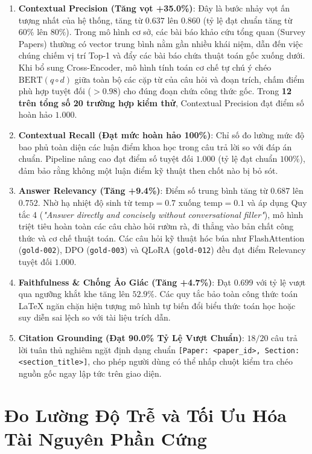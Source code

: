 \begin{enumerate}[label=\textbf{\arabic*.}]
  \item \textbf{Contextual Precision (Tăng vọt +35.0\%)}:
    Đây là bước nhảy vọt ấn tượng nhất của hệ thống, tăng từ $0.637$ lên \textbf{$0.860$} (tỷ lệ đạt chuẩn tăng từ $60\%$ lên \textbf{$80\%$}). Trong mô hình cơ sở, các bài báo khảo cứu tổng quan (Survey Papers) thường có vector trung bình nằm gần nhiều khái niệm, dẫn đến việc chúng chiếm vị trí Top-1 và đẩy các bài báo chứa thuật toán gốc xuống dưới. Khi bổ sung Cross-Encoder, mô hình tính toán cơ chế tự chú ý chéo $\text{BERT}(q \circ d)$ giữa toàn bộ các cặp từ của câu hỏi và đoạn trích, chấm điểm phù hợp tuyệt đối ($>0.98$) cho đúng đoạn chứa công thức gốc. Trong \textbf{12 trên tổng số 20 trường hợp kiểm thử}, Contextual Precision đạt điểm số hoàn hảo \textbf{$1.000$}.
  \item \textbf{Contextual Recall (Đạt mức hoàn hảo 100\%)}:
    Chỉ số đo lường mức độ bao phủ toàn diện các luận điểm khoa học trong câu trả lời so với đáp án chuẩn. Pipeline nâng cao đạt điểm số tuyệt đối \textbf{$1.000$} (tỷ lệ đạt chuẩn $100\%$), đảm bảo rằng không một luận điểm kỹ thuật then chốt nào bị bỏ sót.
  \item \textbf{Answer Relevancy (Tăng +9.4\%)}:
    Điểm số trung bình tăng từ $0.687$ lên \textbf{$0.752$}. Nhờ hạ nhiệt độ sinh từ $\text{temp} = 0.7$ xuống $\text{temp} = 0.1$ và áp dụng Quy tắc 4 (\textit{"Answer directly and concisely without conversational filler"}), mô hình triệt tiêu hoàn toàn các câu chào hỏi rườm rà, đi thẳng vào bản chất công thức và cơ chế thuật toán. Các câu hỏi kỹ thuật hóc búa như FlashAttention (\texttt{gold-002}), DPO (\texttt{gold-003}) và QLoRA (\texttt{gold-012}) đều đạt điểm Relevancy tuyệt đối \textbf{$1.000$}.
  \item \textbf{Faithfulness \& Chống Ảo Giác (Tăng +4.7\%)}:
    Đạt $0.699$ với tỷ lệ vượt qua ngưỡng khắt khe tăng lên $52.9\%$. Các quy tắc bảo toàn công thức toán LaTeX ngăn chặn hiện tượng mô hình tự biến đổi biểu thức toán học hoặc suy diễn sai lệch so với tài liệu trích dẫn.
  \item \textbf{Citation Grounding (Đạt 90.0\% Tỷ Lệ Vượt Chuẩn)}:
    $18/20$ câu trả lời tuân thủ nghiêm ngặt định dạng chuẩn \lstinline{[Paper: <paper_id>, Section: <section_title>]}, cho phép người dùng có thể nhấp chuột kiểm tra chéo nguồn gốc ngay lập tức trên giao diện.
\end{enumerate}

\section{Đo Lường Độ Trễ và Tối Ưu Hóa Tài Nguyên Phần Cứng}

